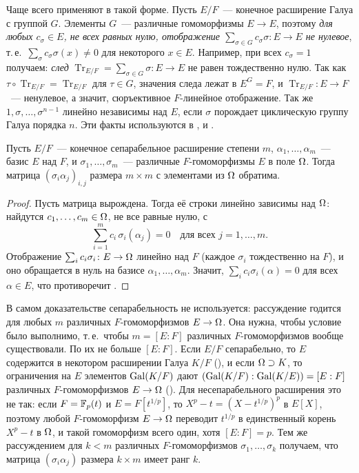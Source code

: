 \begin{remark}[5.15a]
Чаще всего  применяют в такой форме. Пусть $E/F$~--- конечное расширение Галуа с группой $G$. Элементы $G$~---
различные гомоморфизмы $E\to E$, поэтому \emph{для любых $c_\sigma\in E$, не всех равных нулю, отображение
$\sum_{\sigma\in G}c_\sigma\sigma\colon E\to E$ не нулевое}, т.\,е.\ $\sum_\sigma c_\sigma\sigma(x)\ne0$ для некоторого
$x\in E$. Например, при всех $c_\sigma=1$ получаем: \emph{след} $\operatorname{Tr}_{E/F}=\sum_{\sigma\in G}\sigma\colon
E\to E$ не равен тождественно нулю. Так как $\tau\circ\operatorname{Tr}_{E/F}=\operatorname{Tr}_{E/F}$ для $\tau\in G$,
значения следа лежат в $E^G=F$, и $\operatorname{Tr}_{E/F}\colon E\to F$~--- ненулевое, а значит, сюръективное
$F$-линейное отображение. Так же $1,\sigma,\dots,\sigma^{n-1}$ линейно независимы над $E$, если $\sigma$ порождает
циклическую группу Галуа порядка $n$. Эти факты используются в ,  и .
\end{remark}

\begin{corollary}[5.16]
Пусть $E/F$~--- конечное сепарабельное расширение степени $m$, $\alpha_1,\dots,\alpha_m$~--- базис $E$ над $F$, и
$\sigma_1,\dots,\sigma_m$~--- различные $F$-гомоморфизмы $E$ в поле $\Omega$. Тогда матрица $(\sigma_i\alpha_j)_{i,j}$ размера
$m\times m$ с элементами из $\Omega$ обратима.
\end{corollary}

\begin{proof}
Пусть матрица вырождена. Тогда её строки линейно зависимы над $\Omega$: найдутся $c_1,\dots,c_m\in\Omega$, не все равные нулю,
с
\[
\sum_{i=1}^m c_i\,\sigma_i(\alpha_j)=0\quad\text{для всех } j=1,\dots,m.
\]
Отображение $\sum_ic_i\sigma_i\colon E\to\Omega$ линейно над $F$ (каждое $\sigma_i$ тождественно на $F$), и оно обращается в
нуль на базисе $\alpha_1,\dots,\alpha_m$. Значит, $\sum_ic_i\sigma_i(\alpha)=0$ для всех $\alpha\in E$, что противоречит
.
\end{proof}

\begin{remark}
В самом доказательстве сепарабельность не используется: рассуждение годится для любых $m$ различных
$F$-гомоморфизмов $E\to\Omega$. Она нужна, чтобы условие было выполнимо, т.\,е.\ чтобы $m=[E:F]$ различных $F$-гомоморфизмов
вообще существовали. По  их не больше $[E:F]$. Если $E/F$ сепарабельно, то $E$ содержится в некотором
расширении Галуа $K/F$ (), и если $\Omega\supset K$, то ограничения на $E$ элементов $\operatorname{Gal}(K/F)$ дают
$(\operatorname{Gal}(K/F):\operatorname{Gal}(K/E))=[E:F]$ различных $F$-гомоморфизмов $E\to\Omega$ (). Для несепарабельного
расширения это не так: если $F=\mathbb F_p(t)$ и $E=F[t^{1/p}]$, то $X^p-t=(X-t^{1/p})^p$ в $E[X]$, поэтому любой
$F$-гомоморфизм $E\to\Omega$ переводит $t^{1/p}$ в единственный корень $X^p-t$ в $\Omega$, и такой гомоморфизм всего один, хотя
$[E:F]=p$. Тем же рассуждением для $k<m$ различных $F$-гомоморфизмов $\sigma_1,\dots,\sigma_k$ получаем, что матрица
$(\sigma_i\alpha_j)$ размера $k\times m$ имеет ранг $k$.
\end{remark}

